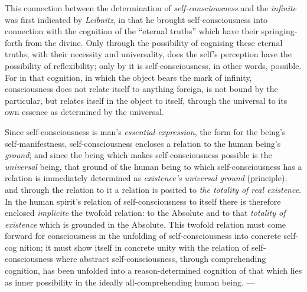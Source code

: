 \documentclass[12pt,a4paper]{book}
\begin{document}
This connection between the determination of \emph{self-consciousness} and the
\emph{infinite} was first indicated by \emph{Leibnitz}, in that he brought
self-consciousness into connection with the cognition of the ``eternal
truths'' which have their springing-forth from the divine. Only through the
possibility of cognising these eternal truths, with their necessity and
universality, does the self's perception have the possibility of
reflexibility; only by it is self-consciousness, in other words, possible. For
in that cognition, in which the object bears the mark of infinity,
consciousness does not relate itself to anything foreign, is not bound by the
particular, but relates itself in the object to itself, through the universal
to its own essence as determined by the universal.

Since self-consciousness is man's \emph{essential expression}, the form for
the being's self-manifestness, self-consciousness encloses a relation to the
human being's \emph{ground}; and since the being which makes
self-consciousness possible is the \emph{universal} being, that ground of the
human being to which self-consciousness has a relation is immediately
determined as \emph{existence's universal ground} (principle); and through the
relation to it a relation is posited to \emph{the totality of real existence}.
In the human spirit's relation of self-consciousness to itself there is
therefore enclosed \textit{implicite} the twofold relation: to the Absolute
and to that \emph{totality of existence} which is grounded in the Absolute.
This twofold relation must come forward for consciousness in the unfolding of
self-consciousness into concrete self-cog\-%
nition; it must show itself in concrete unity with the relation of
self-consciousness where abstract self-consciousness, through comprehending
cognition, has been unfolded into a reason-determined cognition of that which
lies as inner possibility in the ideally all-comprehending human being. ---
\end{document}
